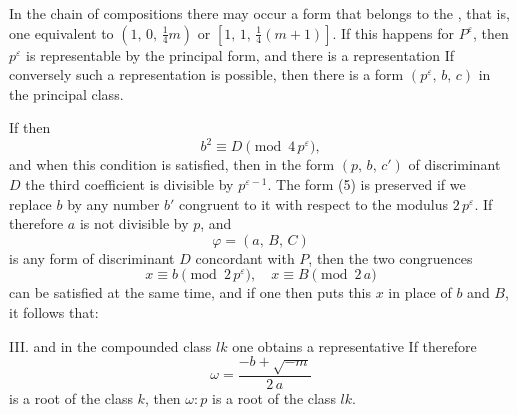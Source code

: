 
In the chain of compositions
there may occur a form that belongs to the , that is, one equivalent to $(1,\,0,\,\tfrac14 m)$ or $[1,\,1,\,\tfrac14(m+1)]$. If this happens for $P^{\varepsilon}$, then $p^{\varepsilon}$ is representable by the principal form, and there is a  representation
If conversely such a representation is possible, then there is a form $(p^{\varepsilon},\,b,\,c)$ in the principal class.


If
then
\[
b^2 \equiv D \pmod{4\,p^{\varepsilon}},
\]
and when this condition is satisfied, then in the form $(p,\,b,\,c')$ of discriminant $D$ the third coefficient is divisible by $p^{\varepsilon-1}$. The form (5) is preserved if we replace $b$ by any number $b'$ congruent to it with respect to the modulus $2\,p^{\varepsilon}$. If therefore $a$ is not divisible by $p$, and
\[
\varphi = (a,\,B,\,C)
\]
is any form of discriminant $D$ concordant with $P$, then the two congruences
\[
x \equiv b \pmod{2\,p^{\varepsilon}}, \quad x \equiv B \pmod{2\,a}
\]
can be satisfied at the same time, and if one then puts this $x$ in place of $b$ and $B$, it follows that:

III. 
and in the compounded class $lk$ one obtains a representative
If therefore
\[
\omega = \frac{-b+\sqrt{-m}}{2\,a}
\]
is a root of the class $k$, then $\omega\colon p$ is a root of the class $lk$.
